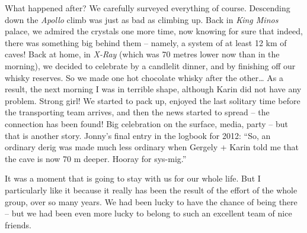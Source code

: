 What happened after? We carefully surveyed everything of course.
Descending down the \emph{Apollo} climb was just as bad as climbing up.
Back in \emph{King Minos} palace, we admired the crystals one more time,
now knowing for sure that indeed, there was something big behind them --
namely, a system of at least 12 km of caves! Back at home, in
\emph{X-Ray} (which was 70 metres lower now than in the morning), we
decided to celebrate by a candlelit dinner, and by finishing off our
whisky reserves. So we made one hot chocolate whisky after the
other\ldots{} As a result, the next morning I was in terrible shape,
although Karin did not have any problem. Strong girl! We started to pack
up, enjoyed the last solitary time before the transporting team arrives,
and then the news started to spread -- the connection has been found!
Big celebration on the surface, media, party -- but that is another
story. Jonny's final entry in the logbook for 2012: ``So, an ordinary
derig was made much less ordinary when Gergely + Karin told me that the
cave is now 70 m deeper. Hooray for sys-mig.''

It was a moment that is going to stay with us for our whole life. But I
particularly like it because it really has been the result of the effort
of the whole group, over so many years. We had been lucky to have the
chance of being there -- but we had been even more lucky to belong to
such an excellent team of nice friends.

